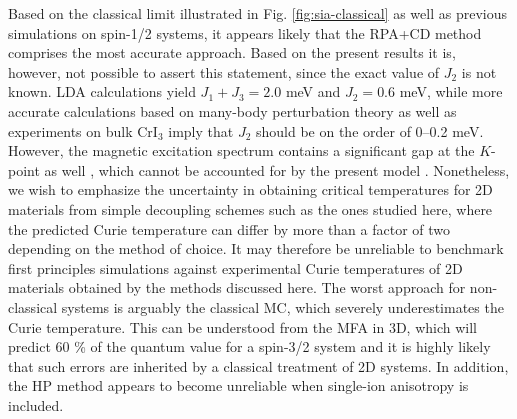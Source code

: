 \documentclass[aps,prb,reprint,floatfix,superscriptaddress]{revtex4-2}
\begin{document}
Based on the classical limit illustrated in Fig. \ref{fig:sia-classical} as well as previous simulations on spin-1/2 systems, it appears likely that the RPA+CD method comprises the most accurate approach. Based on the present results it is, however, not possible to assert this statement, since the exact value of $J_2$ is not known. LDA calculations yield $J_1+J_3=2.0$ meV and $J_2=0.6$ meV, while more accurate calculations based on many-body perturbation theory \cite{Olsen2021} as well as experiments on bulk CrI$_3$ \cite{Chen2018a,Lee2020} imply that $J_2$ should be on the order of 0--0.2 meV. However, the magnetic excitation spectrum contains a significant gap at the $K$-point as well \cite{Chen2018a, Lee2020}, which cannot be accounted for by the present model \cite{Olsen2021,Delugas2023}. Nonetheless, we wish to emphasize the uncertainty in obtaining critical temperatures for 2D materials from simple decoupling schemes such as the ones studied here, where the predicted Curie temperature can differ by more than a factor of two depending on the method of choice. It may therefore be unreliable to benchmark first principles simulations against experimental Curie temperatures of 2D materials obtained by the methods discussed here. The worst approach for non-classical systems is arguably the classical MC, which severely underestimates the Curie temperature. This can be understood from the MFA in 3D, which will predict 60 \% of the quantum value for a spin-3/2 system and it is highly likely that such errors are inherited by a classical treatment of 2D systems. In addition, the HP method appears to become unreliable when single-ion anisotropy is included. 
\end{document}
